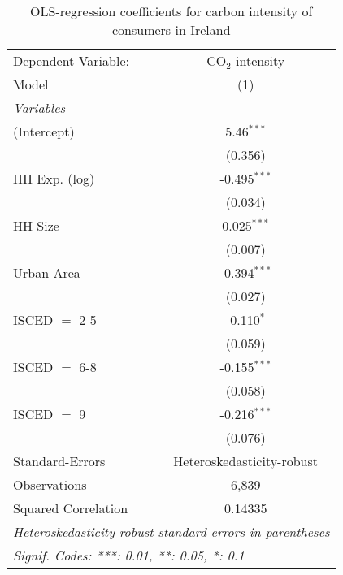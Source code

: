 
\begin{table}[htbp!]
   \centering
   \small
   \begin{adjustbox}{width = 1\textwidth, max height = 0.95\textheight, center}
      \begin{threeparttable}[b]
         \caption{\label{tab:OLS_1_IRL} OLS-regression coefficients for carbon intensity of consumers in Ireland}
         \begin{tabular}{lc}
            \tabularnewline \midrule \midrule
            Dependent Variable: & CO$_{2}$ intensity\\  
            Model               & (1)\\  
            \midrule
            \emph{Variables}\\
            (Intercept)         & 5.46$^{***}$\\   
                                & (0.356)\\   
            HH Exp. (log)       & -0.495$^{***}$\\   
                                & (0.034)\\   
            HH Size             & 0.025$^{***}$\\   
                                & (0.007)\\   
            Urban Area          & -0.394$^{***}$\\   
                                & (0.027)\\   
            ISCED $=$ 2-5       & -0.110$^{*}$\\   
                                & (0.059)\\   
            ISCED $=$ 6-8       & -0.155$^{***}$\\   
                                & (0.058)\\   
            ISCED $=$ 9         & -0.216$^{***}$\\   
                                & (0.076)\\   
            \midrule 
            Standard-Errors     & Heteroskedasticity-robust \\   
            Observations        & 6,839\\  
            Squared Correlation & 0.14335\\  
            \midrule \midrule
            \multicolumn{2}{l}{\emph{Heteroskedasticity-robust standard-errors in parentheses}}\\
            \multicolumn{2}{l}{\emph{Signif. Codes: ***: 0.01, **: 0.05, *: 0.1}}\\
         \end{tabular}
         

\end{threeparttable}
\end{adjustbox}
\end{table}
